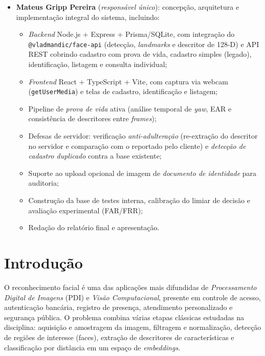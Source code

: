 \documentclass[12pt,a4paper]{article}
\begin{document}
\begin{itemize}[leftmargin=*]
    \item \textbf{Mateus Gripp Pereira} (\textit{respons\'avel \'unico}): concep\c{c}\~ao,
    arquitetura e implementa\c{c}\~ao integral do sistema, incluindo:
    \begin{itemize}
        \item \emph{Backend} Node.js + Express + Prisma/SQLite, com integra\c{c}\~ao
        do \texttt{@vladmandic/face-api} (detec\c{c}\~ao, \emph{landmarks} e descritor
        de 128-D) e API REST cobrindo cadastro com prova de vida, cadastro simples
        (legado), identifica\c{c}\~ao, listagem e consulta individual;
        \item \emph{Frontend} React + TypeScript + Vite, com captura via webcam
        (\texttt{getUserMedia}) e telas de cadastro, identifica\c{c}\~ao e listagem;
        \item Pipeline de \emph{prova de vida} ativa (an\'alise temporal de \emph{yaw},
        EAR e consist\^encia de descritores entre \emph{frames});
        \item Defesas de servidor: verifica\c{c}\~ao \emph{anti-adultera\c{c}\~ao}
        (re-extra\c{c}\~ao do descritor no servidor e compara\c{c}\~ao com o reportado pelo
        cliente) e \emph{detec\c{c}\~ao de cadastro duplicado} contra a base existente;
        \item Suporte ao upload opcional de imagem de \emph{documento de identidade}
        para auditoria;
        \item Constru\c{c}\~ao da base de testes interna, calibra\c{c}\~ao do limiar de
        decis\~ao e avalia\c{c}\~ao experimental (FAR/FRR);
        \item Reda\c{c}\~ao do relat\'orio final e apresenta\c{c}\~ao.
    \end{itemize}
\end{itemize}

\section{Introdu\c{c}\~ao}

O reconhecimento facial \'e uma das aplica\c{c}\~oes mais difundidas de \emph{Processamento Digital
de Imagens} (PDI) e \emph{Vis\~ao Computacional}, presente em controle de acesso, autentica\c{c}\~ao
banc\'aria, registro de presen\c{c}a, atendimento personalizado e seguran\c{c}a p\'ublica. O problema
combina v\'arias etapas cl\'assicas estudadas na disciplina: aquisi\c{c}\~ao e amostragem da imagem,
filtragem e normaliza\c{c}\~ao, detec\c{c}\~ao de regi\~oes de interesse (faces), extra\c{c}\~ao de
descritores de caracter\'isticas e classifica\c{c}\~ao por dist\^ancia em um espa\c{c}o de
\emph{embeddings}.
\end{document}
